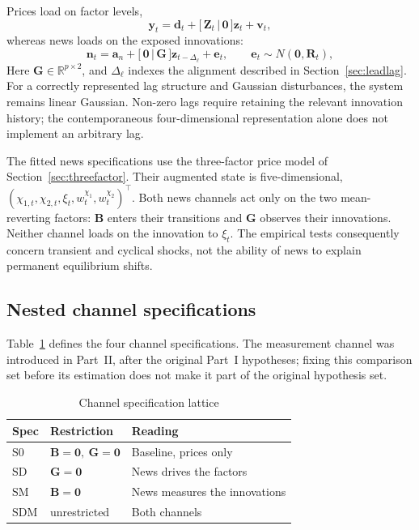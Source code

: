 \documentclass[journal]{IEEEtran}
\begin{document}
Prices load on factor levels,
\begin{equation}
  \bm{y}_t = \bm{d}_t + \bigl[\,\bm{Z}_t \,\big|\, \bm{0}\,\bigr]\bm{z}_t + \bm{v}_t ,
  \label{eq:priceblock}
\end{equation}
whereas news loads on the exposed innovations:
\begin{equation}
  \bm{n}_t = \bm{a}_n + \bigl[\,\bm{0} \,\big|\, \bm{G}\,\bigr]\bm{z}_{t-\Delta_\ell} + \bm{e}_t ,
  \qquad \bm{e}_t \sim N(\bm{0}, \bm{R}_t) ,
  \label{eq:newsblock}
\end{equation}
Here $\bm{G}\in\mathbb{R}^{p\times2}$, and $\Delta_\ell$ indexes the alignment described in Section~\ref{sec:leadlag}. For a correctly represented lag structure and Gaussian disturbances, the system remains linear Gaussian. Non-zero lags require retaining the relevant innovation history; the contemporaneous four-dimensional representation alone does not implement an arbitrary lag.

The fitted news specifications use the three-factor price model of Section~\ref{sec:threefactor}. Their augmented state is five-dimensional, $(\chi_{1,t},\chi_{2,t},\xi_t,w^{\chi_1}_t,w^{\chi_2}_t)^{\!\top}$. Both news channels act only on the two mean-reverting factors: $\bm{B}$ enters their transitions and $\bm{G}$ observes their innovations. Neither channel loads on the innovation to $\xi_t$. The empirical tests consequently concern transient and cyclical shocks, not the ability of news to explain permanent equilibrium shifts.

\subsection{Nested channel specifications}
\label{sec:lattice}

Table~\ref{tab:lattice} defines the four channel specifications. The measurement channel was introduced in Part~II, after the original Part~I hypotheses; fixing this comparison set before its estimation does not make it part of the original hypothesis set.
\begin{table}[H]
\centering
\caption{Channel specification lattice}
\label{tab:lattice}
\small
\renewcommand{\arraystretch}{1.2}
\begin{tabular}{@{}llp{3.1cm}@{}}
\toprule
\textbf{Spec} & \textbf{Restriction} & \textbf{Reading} \\
\midrule
$\mathrm{S0}$  & $\bm{B}=\bm{0},\ \bm{G}=\bm{0}$ & Baseline, prices only \\
$\mathrm{SD}$  & $\bm{G}=\bm{0}$                 & News drives the factors \\
$\mathrm{SM}$  & $\bm{B}=\bm{0}$                 & News measures the innovations \\
$\mathrm{SDM}$ & unrestricted                    & Both channels \\
\bottomrule
\end{tabular}
\end{table}
\end{document}
